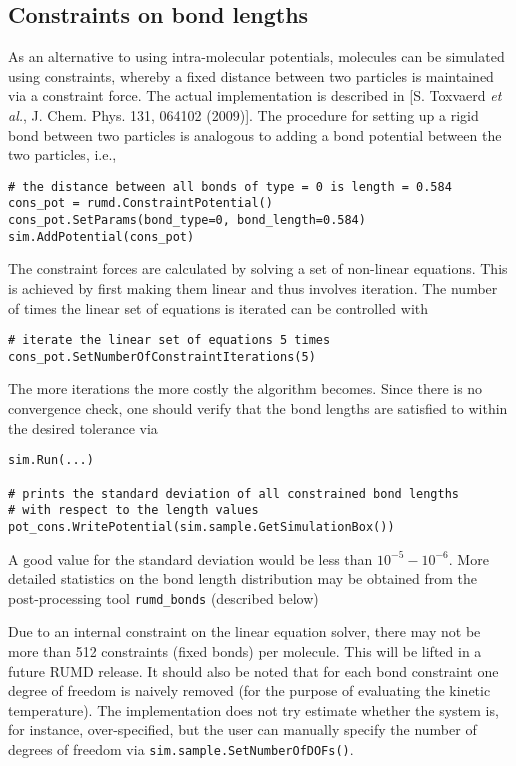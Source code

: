 \documentclass[a4paper]{article}
\begin{document}
\subsection{Constraints on bond lengths}

As an alternative to using intra-molecular potentials, molecules can be 
simulated using constraints, whereby a fixed distance between two particles is 
maintained via a constraint force. The actual implementation is described in 
[S. Toxvaerd \textit{et al.}, J. Chem. Phys. 131, 064102 (2009)]. 
The procedure for setting up a rigid bond between two particles is analogous to 
adding a bond potential between the two particles, i.e.,

\begin{verbatim}
# the distance between all bonds of type = 0 is length = 0.584
cons_pot = rumd.ConstraintPotential()
cons_pot.SetParams(bond_type=0, bond_length=0.584)
sim.AddPotential(cons_pot)
\end{verbatim}
The constraint forces are calculated by solving a set of non-linear equations. This is achieved by first making them linear and thus involves iteration. The number of times the 
linear set of equations is iterated can be controlled with

\begin{verbatim}
# iterate the linear set of equations 5 times
cons_pot.SetNumberOfConstraintIterations(5)
\end{verbatim} 
The more iterations the more costly the algorithm becomes. Since there is no convergence check, one should verify that the bond lengths are satisfied to within the desired tolerance via

\begin{verbatim}
sim.Run(...)

# prints the standard deviation of all constrained bond lengths
# with respect to the length values
pot_cons.WritePotential(sim.sample.GetSimulationBox())
\end{verbatim} 
A good value for the standard deviation would be less than $10^{-5}-10^{-6}$. More detailed statistics on the bond length distribution may be obtained from the post-processing tool \verb|rumd_bonds| (described below)

Due to an internal constraint on the linear equation solver, there may not be more than 512 constraints (fixed bonds) per molecule. This will be lifted in a future RUMD release. It should also be noted that for each bond constraint one degree of freedom is naively removed (for the purpose of evaluating the kinetic temperature). The implementation does not try estimate whether the system is, for instance, over-specified, but the user can manually specify the number of degrees of freedom via \verb|sim.sample.SetNumberOfDOFs()|. 
\end{document}
